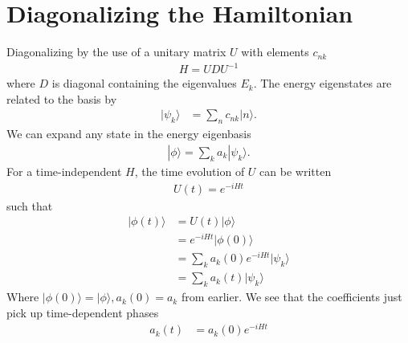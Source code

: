 \section{Diagonalizing the Hamiltonian}
Diagonalizing by the use of a unitary matrix $U$ with elements $c_{nk}$
\begin{align}
    H = U D U^{-1}
\end{align}
where $D$ is diagonal containing the eigenvalues $E_k$. The energy eigenstates are related to the basis by
\begin{align}
    | \psi_k \rangle &= \sum_n c_{nk} |n\rangle .
\end{align}
We can expand any state in the energy eigenbasis
\begin{align}
    |\phi \rangle = \sum_{k} a_k |\psi_k\rangle.
\end{align}
For a time-independent $H$, the time evolution of $U$ can be written
\begin{align}
    U(t) = e^{-i H t}
\end{align}
such that
\begin{align}
    |\phi(t)\rangle &= U(t)|\phi\rangle \\
    &= e^{-i H t} |\phi(0) \rangle \\
    &= \sum_k a_k(0) e^{-i H t} |\psi_k\rangle \\
    &= \sum_k a_k(t) |\psi_k\rangle
\end{align}
Where $|\phi(0) \rangle = |\phi\rangle, a_k(0) = a_k$ from earlier. We see that the coefficients just pick up time-dependent phases
\begin{align}
    a_k(t) &= a_k(0) e^{-iHt}
\end{align}

